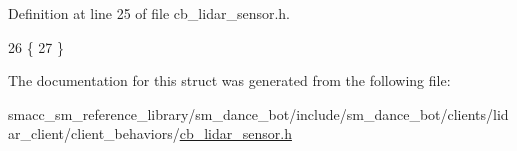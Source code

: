Definition at line 25 of file cb\+\_\+lidar\+\_\+sensor.\+h.


\begin{DoxyCode}
26   \{
27   \}
\end{DoxyCode}


The documentation for this struct was generated from the following file\+:\begin{DoxyCompactItemize}
\item 
smacc\+\_\+sm\+\_\+reference\+\_\+library/sm\+\_\+dance\+\_\+bot/include/sm\+\_\+dance\+\_\+bot/clients/lidar\+\_\+client/client\+\_\+behaviors/\hyperlink{cb__lidar__sensor_8h}{cb\+\_\+lidar\+\_\+sensor.\+h}\end{DoxyCompactItemize}
